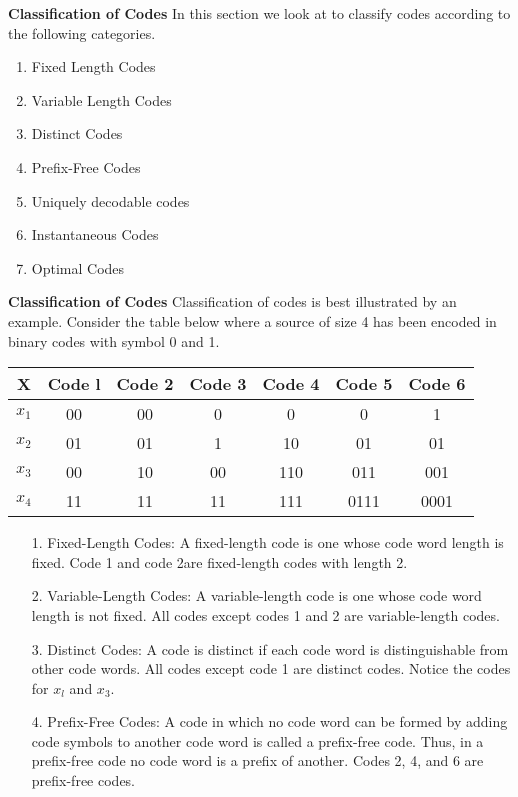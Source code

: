 
\noindent \textbf{Classification of Codes}
In this section we look at to classify codes according to the following categories.
\begin{enumerate}
\item Fixed Length Codes
\item Variable Length Codes
\item Distinct Codes
\item Prefix-Free Codes
\item Uniquely decodable codes
\item Instantaneous Codes
\item Optimal Codes
\end{enumerate}


\noindent \textbf{Classification of Codes}
Classification of codes is best illustrated by an example. Consider the table below where a source of
size 4 has been encoded in binary codes with symbol 0 and 1.\\ \bigskip
\begin{center}
\begin{tabular}{|c| c| c| c| c| c| c|}
\hline
X& Code l& Code 2& Code 3 &Code 4& Code 5& Code 6\\\hline
$x_1$& 00& 00 &0 &0 &0 &1\\
$x_2$& 01& 01 &1 &10 &01 &01\\
$x_3$ &00 &10& 00& 110& 011 &001\\
$x_4$ &11& 11& 11& 111 &0111 &0001\\\hline
\end{tabular}
\end{center}




\begin{itemize}
\item[1.] Fixed-Length Codes: A fixed-length code is one whose code word length is fixed. Code 1 and code 2are
fixed-length codes with length 2.
\item[2.] Variable-Length Codes: A variable-length code is one whose code word length is not fixed. All codes except codes 1 and 2 are variable-length codes.
\item[3.] Distinct Codes:
A code is distinct if each code word is distinguishable from other code words. All codes except code 1 are distinct codes. Notice the codes for $x_l$ and $x_3$.
\item[4.] Prefix-Free Codes:
A code in which no code word can be formed by adding code symbols to another code word is
called a prefix-free code. Thus, in a prefix-free code no code word is a prefix of another. Codes 2, 4,
and 6 are prefix-free codes.
\end{itemize}


